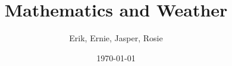 \documentclass[14pt, a1paper, landscape]{tikzposter}
\title{Mathematics and Weather}
\author{Erik, Ernie, Jasper, Rosie}
\date{\today}
\institute{Cambridge Maths School}
\begin{document}
\maketitle

\newcommand\inlineeqno{\hspace{1em} \stepcounter{equation}\ (\theequation) \hspace{1em} }
\renewenvironment{tikzfigure}[1][]{
  \def \rememberparameter{#1}
  \vspace{10pt}
  \refstepcounter{figurecounter}
  \begin{center}
  }{
    \ifx\rememberparameter\@empty
    \else %
    \\[10pt]
    {\small \rememberparameter}
    \fi
  \end{center}
}

\end{document}

